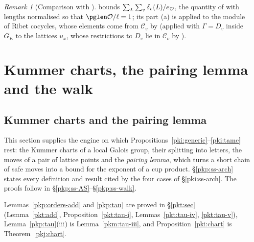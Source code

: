 \documentclass[10pt]{amsart}
\theoremstyle{definition}
\theoremstyle{remark}
\newtheorem{remark}[theorem]{Remark}
\newcommand{\Q}{\mathbb Q}
\providecommand{\pgG}{G_E}
\begin{document}
\begin{remark}[Comparison with {\cite[Proposition~4.5]{P55}}]\label{pki:align}
{\cite[Proposition~4.5(b)]{P55}} bounds $\sum_L\sum_v\delta_v(L)/e_\auO$, the quantity of
{\cite[Proposition~5.2]{P55}} with lengths normalised so that $\pglen\auO/\ell=1$; its part (a) is
{\cite[Proposition~5.4]{P55}} applied to the module of Ribet cocycles, whose elements come from
$\mathcal C_v$ by {\cite[Lemma~5.5]{P55}} (applied with $\Gamma=D_v$ inside $\pgG$ to the lattices
$u_x$, whose restrictions to $D_v$ lie in $\mathcal C_v$ by {\cite[Proposition~4.5(b)]{P55}}).
\end{remark}



\section{Kummer charts, the pairing lemma and the walk}\label{C4:g2}
\providecommand{\auO}{\mathcal O}
\providecommand{\auQlb}{\overline{\Q}_\ell}
\providecommand{\panot}[1]{\par\smallskip{\raggedright\noindent\textbf{[Not proved here:} #1\textbf{]}\par}\smallskip}
\providecommand{\pkpA}{A_{\mathrm{inf}}}
\providecommand{\pkpW}{W(C^\flat)}
\providecommand{\pkpm}{W(\mathfrak m^\flat)}
\providecommand{\pkpM}{M_m}
\providecommand{\pkpsm}{\mathrm{Sm}_m}
\providecommand{\pkpAmb}{\mathbb A}

\subsection{Kummer charts and the pairing lemma}\label{pkp:sec}

This section supplies the engine on which Propositions~\ref{pki:generic}--\ref{pki:tame} rest:
the Kummer charts of a local Galois group, their splitting into letters, the moves of a pair of
lattice points and the \emph{pairing lemma}, which turns a short chain of safe moves into a bound
for the exponent of a cup product. \S\ref{pkp:ss-arch} states every definition and result cited by
the four cases of \S\ref{pki:ss-arch}. The proofs follow in
\S\ref{pkp:ss-AS}--\S\ref{pkp:ss-walk}.

Lemmas~\ref{pkp:orders-add} and \ref{pkp:tau} are proved in \S\ref{pkt:sec} (Lemma~\ref{pkt:add},
Proposition~\ref{pkt:tau-i}, Lemmas~\ref{pkt:tau-iv}, \ref{pkt:tau-v}), Lemma~\ref{pkp:tau}(iii) is
Lemma~\ref{pkm:tau-iii}, and Proposition~\ref{pki:chart} is Theorem~\ref{pkj:chart}.
\end{document}
